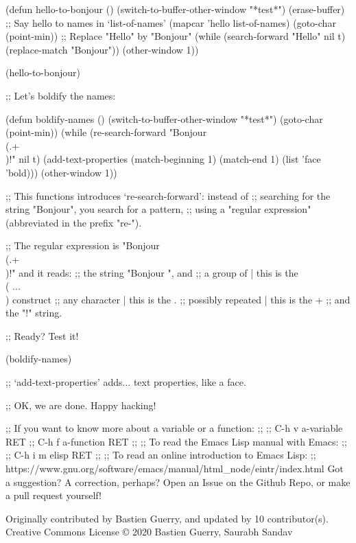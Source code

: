 (defun hello-to-bonjour ()
    (switch-to-buffer-other-window "*test*")
    (erase-buffer)
    ;; Say hello to names in `list-of-names'
    (mapcar 'hello list-of-names)
    (goto-char (point-min))
    ;; Replace "Hello" by "Bonjour"
    (while (search-forward "Hello" nil t)
      (replace-match "Bonjour"))
    (other-window 1))

(hello-to-bonjour)

;; Let's boldify the names:

(defun boldify-names ()
    (switch-to-buffer-other-window "*test*")
    (goto-char (point-min))
    (while (re-search-forward "Bonjour \\(.+\\)!" nil t)
      (add-text-properties (match-beginning 1)
                           (match-end 1)
                           (list 'face 'bold)))
    (other-window 1))

;; This functions introduces `re-search-forward': instead of
;; searching for the string "Bonjour", you search for a pattern,
;; using a "regular expression" (abbreviated in the prefix "re-").

;; The regular expression is "Bonjour \\(.+\\)!" and it reads:
;; the string "Bonjour ", and
;; a group of            | this is the \\( ... \\) construct
;;   any character       | this is the .
;;   possibly repeated   | this is the +
;; and the "!" string.

;; Ready?  Test it!

(boldify-names)

;; `add-text-properties' adds... text properties, like a face.

;; OK, we are done.  Happy hacking!

;; If you want to know more about a variable or a function:
;;
;; C-h v a-variable RET
;; C-h f a-function RET
;;
;; To read the Emacs Lisp manual with Emacs:
;;
;; C-h i m elisp RET
;;
;; To read an online introduction to Emacs Lisp:
;; https://www.gnu.org/software/emacs/manual/html_node/eintr/index.html
Got a suggestion? A correction, perhaps? Open an Issue on the Github Repo, or make a pull request yourself!

Originally contributed by Bastien Guerry, and updated by 10 contributor(s).
Creative Commons License
© 2020 Bastien Guerry, Saurabh Sandav

